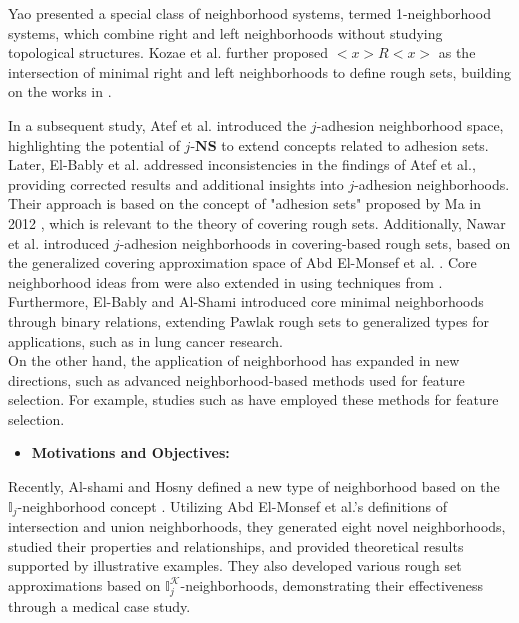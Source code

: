 \documentclass{article}
\theoremstyle{theorem}
\theoremstyle{definition}
\theoremstyle{remark}
\begin{document}
Yao \cite{Yao 1998} presented a special class of neighborhood systems, termed 1-neighborhood systems, which combine right and left neighborhoods without studying topological structures. Kozae et al. \cite{Kozae 2010} further proposed $<x>R<x>$ as the intersection of minimal right and left neighborhoods to define rough sets, building on the works in \cite{Allam2005, Allam2006}.

In a subsequent study, Atef et al. \cite{Atef 2020} introduced the $j$-adhesion neighborhood space, highlighting the potential of $j$-$\textbf{NS}$ to extend concepts related to adhesion sets. Later, El-Bably et al. \cite{El-Bably 2021} addressed inconsistencies in the findings of Atef et al., providing corrected results and additional insights into $j$-adhesion neighborhoods. Their approach is based on the concept of "adhesion sets" proposed by Ma in 2012 \cite{Ma 2012}, which is relevant to the theory of covering rough sets.
Additionally, Nawar et al. \cite{Nawar 2021} introduced $j$-adhesion neighborhoods in covering-based rough sets, based on the generalized covering approximation space of Abd El-Monsef et al. \cite{Abd El-Monsef 2015}. Core neighborhood ideas from \cite{Hung 2008,Xiaole 2013} were also extended in \cite{Mareay 2016} using techniques from \cite{khadra2007,Abd El-Monsef 2014}. Furthermore, El-Bably and Al-Shami \cite{El-Bably 2021} introduced core minimal neighborhoods through binary relations, extending Pawlak rough sets to generalized types for applications, such as in lung cancer research. \\

On the other hand, the application of neighborhood has expanded in new directions, such as advanced neighborhood-based methods used for feature selection. For example, studies such as \cite{Zhang 2024, Zhang 2022, Liu 2022, Xiao 2022} have employed these methods for feature selection.\\


\begin{itemize}
  \item \textbf{Motivations and Objectives:}
\end{itemize}

Recently, Al-shami and Hosny \cite{Al-shami 2024} defined a new type of neighborhood based on the $\mathbb{I}_{j}$-neighborhood concept \cite{Al-shami 2021}. Utilizing Abd El-Monsef et al.'s \cite{Abd El-Monsef 2014} definitions of intersection and union neighborhoods, they generated eight novel neighborhoods, studied their properties and relationships, and provided theoretical results supported by illustrative examples. They also developed various rough set approximations based on $\mathbb{I}^{\mathcal{K}}_{j}$-neighborhoods, demonstrating their effectiveness through a medical case study.
\end{document}
